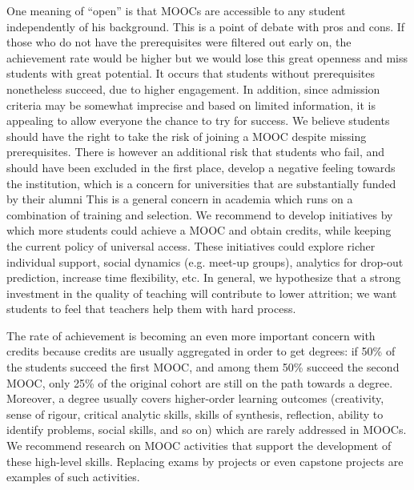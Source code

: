 One meaning of  
``open''  is that MOOCs are accessible to any
student independently of his background. This is a point of debate with
pros and cons. If those who do not have the prerequisites were filtered
out early on, the achievement rate would be higher but we would lose
this great openness and miss students with great potential. It occurs
that students without prerequisites nonetheless succeed, due to higher
engagement. In addition, since admission criteria may be somewhat
imprecise and based on limited information, it is appealing to allow
everyone the chance to try for success. We believe students should have
the right to take the risk of joining a MOOC despite missing
prerequisites. There is however an additional risk that students who
fail, and should have been excluded in the first place, develop a
negative feeling towards the institution, which is a concern for
universities that are substantially funded by their alumni 
 This is a
general concern in academia which runs on a combination of training and
selection.  We recommend to develop initiatives by which more students
could achieve a MOOC and obtain credits, while keeping the current
policy of universal access. These initiatives could explore richer
individual support, social dynamics (e.g. meet-up groups), analytics for
drop-out prediction, increase time flexibility, etc. In general, we
hypothesize that a strong investment in the quality of teaching will
contribute to lower attrition; we want students to feel that teachers
help them with hard process.

The rate of achievement is becoming an even more important concern with
credits because credits are usually aggregated in order to get degrees:
if 50\% of the students succeed the first MOOC, and among them 50\%
succeed the second MOOC, only 25\% of the original cohort are still on
the path towards a degree. Moreover, a degree usually covers
higher-order learning outcomes (creativity, sense of rigour, critical
analytic skills, skills of synthesis, reflection, ability to identify
problems, social skills, and so on) which are rarely addressed in MOOCs. We
recommend research on MOOC activities that support the development of
these high-level skills. Replacing exams by projects or even capstone
projects are examples of such activities.


